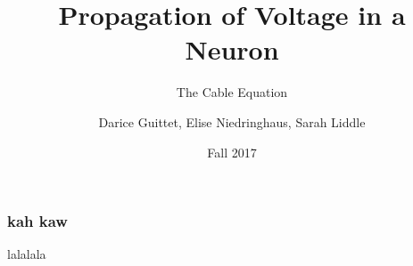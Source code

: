 \documentclass{beamer}
\title{Propagation of Voltage in a Neuron}
\subtitle{The Cable Equation}
\author{Darice Guittet, Elise Niedringhaus, Sarah Liddle}
\date{Fall 2017}
\begin{document}
 
\frame{\titlepage}
 
\begin{frame}
\frametitle{kah kaw}
lalalala
\end{frame}
\end{document}
